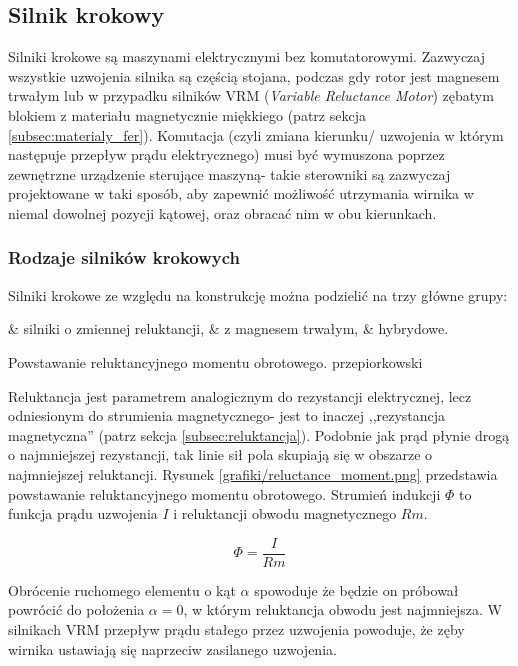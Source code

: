 \subsection{Silnik krokowy}

Silniki krokowe są maszynami elektrycznymi bez komutatorowymi. Zazwyczaj wszystkie uzwojenia silnika są częścią stojana, podczas gdy rotor jest magnesem trwałym lub w przypadku silników VRM ({\em Variable Reluctance Motor}) zębatym blokiem z materiału magnetycznie miękkiego (patrz sekcja \ref{subsec:materialy_fer}). Komutacja (czyli zmiana kierunku/ uzwojenia w którym następuje przepływ prądu elektrycznego) musi być wymuszona poprzez zewnętrzne urządzenie sterujące maszyną- takie sterowniki są zazwyczaj projektowane w taki sposób, aby zapewnić możliwość utrzymania wirnika w niemal dowolnej pozycji kątowej, oraz obracać nim w obu kierunkach. 

\subsubsection{Rodzaje silników krokowych}

Silniki krokowe ze względu na konstrukcję można podzielić na trzy główne grupy: 
\begin{easylist}
	& silniki o zmiennej reluktancji,
	& z magnesem trwałym,
	& hybrydowe.
\end{easylist}

		{Powstawanie reluktancyjnego momentu obrotowego.}
		{przepiorkowski}

Reluktancja jest parametrem analogicznym do rezystancji elektrycznej, lecz odniesionym do strumienia magnetycznego- jest to inaczej ,,rezystancja magnetyczna'' (patrz sekcja \ref{subsec:reluktancja}). Podobnie jak prąd płynie drogą o najmniejszej rezystancji, tak linie sił pola skupiają się w obszarze o najmniejszej reluktancji. Rysunek \ref{grafiki/reluctance_moment.png} przedstawia powstawanie reluktancyjnego momentu obrotowego. Strumień indukcji $ \Phi $ to funkcja prądu uzwojenia $ I $ i reluktancji obwodu magnetycznego $ Rm $. 

\begin{equation} \label{eq:steper1}
	\Phi = \frac{I}{Rm}
\end{equation}

Obrócenie ruchomego elementu o kąt $ \alpha $ spowoduje że będzie on próbował powrócić do położenia $ \alpha = 0 $, w którym reluktancja obwodu jest najmniejsza. W silnikach VRM przepływ prądu stałego przez uzwojenia powoduje, że zęby wirnika ustawiają się naprzeciw zasilanego uzwojenia.

